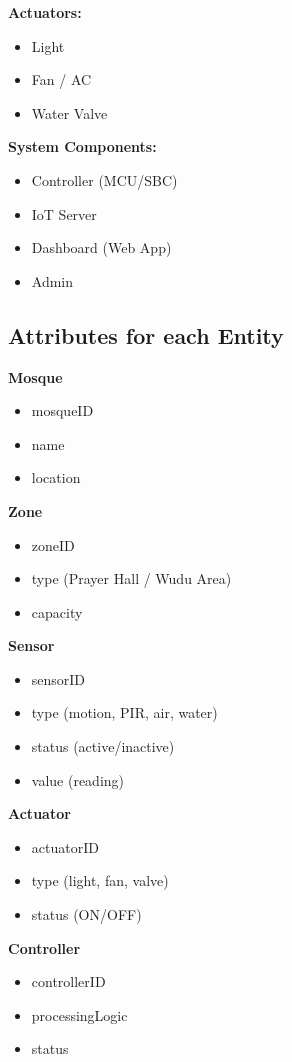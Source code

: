 \textbf{Actuators:}
\begin{itemize}
  \item Light
  \item Fan / AC
  \item Water Valve
\end{itemize}

\textbf{System Components:}
\begin{itemize}
  \item Controller (MCU/SBC)
  \item IoT Server
  \item Dashboard (Web App)
  \item Admin
\end{itemize}

\subsection{Attributes for each Entity}
\textbf{Mosque}
\begin{itemize}
  \item mosqueID
  \item name
  \item location
\end{itemize}

\textbf{Zone}
\begin{itemize}
  \item zoneID
  \item type (Prayer Hall / Wudu Area)
  \item capacity
\end{itemize}

\newpage
\textbf{Sensor}
\begin{itemize}
  \item sensorID
  \item type (motion, PIR, air, water)
  \item status (active/inactive)
  \item value (reading)
\end{itemize}

\textbf{Actuator}
\begin{itemize}
  \item actuatorID
  \item type (light, fan, valve)
  \item status (ON/OFF)
\end{itemize}

\textbf{Controller}
\begin{itemize}
  \item controllerID
  \item processingLogic
  \item status
\end{itemize}

